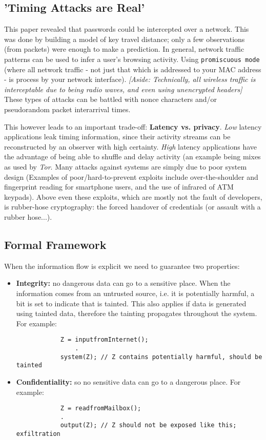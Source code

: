 \documentclass[twoside]{article}
\begin{document}
\subsection{'Timing Attacks are Real'}

This paper revealed that passwords could be intercepted over a network. This was done by building a model of key travel distance; only a few observations (from packets) were enough to make a prediction. In general, network traffic patterns can be used to infer a user's browsing activity. Using \texttt{promiscuous mode} (where all network traffic - not just that which is addressed to your MAC address - is process by your network interface). \textit{[Aside: Technically, all wireless traffic is interceptable due to being radio waves, and even using unencrypted headers]} These types of attacks can be battled with nonce characters and/or pseudorandom packet interarrival times.

This however leads to an important trade-off: \textbf{Latency vs. privacy}. \textit{Low} latency applications leak timing information, since their activity streams can be reconstructed by an observer with high certainty. \textit{High} latency applications have the advantage of being able to shuffle and delay activity (an example being mixes as used by \textit{Tor}.
Many attacks against systems are simply due to poor system design (Examples of poor/hard-to-prevent exploits include over-the-shoulder and fingerprint reading for smartphone users, and the use of infrared of ATM keypads). Above even these exploits, which are mostly not the fault of developers, is rubber-hose cryptography: the forced handover of credentials (or assault with a rubber hose...).

\subsection{Formal Framework}

When the information flow is explicit we need to guarantee two properties: 
\begin{itemize}
	\item \textbf{Integrity:} no dangerous data can go to a sensitive place. When the information comes from an untrusted source, i.e. it is potentially harmful, a bit is set
	to indicate that is tainted. This also applies if data is generated using tainted data, therefore the tainting propagates throughout the system. For example:
		\begin{verbatim}
			Z = inputfromInternet();
				.
			system(Z); // Z contains potentially harmful, should be tainted
		\end{verbatim}
	\item \textbf{Confidentiality:} so no sensitive data can go to a dangerous place. For example:
		\begin{verbatim}
			Z = readfromMailbox();
			.
			output(Z); // Z should not be exposed like this; exfiltration 
		\end{verbatim}
\end{itemize} 
\end{document}
